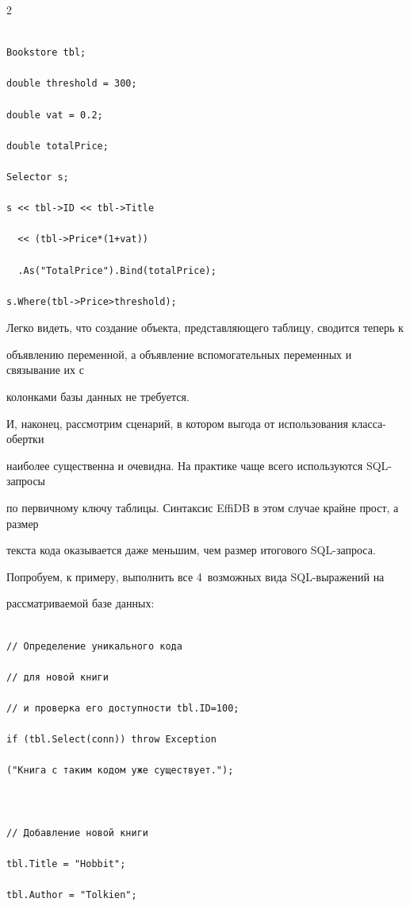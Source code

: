 \begin{multicols}{2}
\begin{verbatim}

Bookstore tbl;

double threshold = 300;

double vat = 0.2;

double totalPrice;

Selector s;

s << tbl->ID << tbl->Title

  << (tbl->Price*(1+vat))

  .As("TotalPrice").Bind(totalPrice);

s.Where(tbl->Price>threshold);

\end{verbatim}



Легко видеть, что создание объекта, пред\-став\-ля\-юще\-го таблицу, сводится теперь к 

объявлению переменной, а объявление вспомогательных переменных и связывание их с 

колонками базы данных не требуется.



И, наконец, рассмотрим сценарий, в котором выгода от использования клас\-са-оберт\-ки 

наиболее существенна и очевидна. На практике чаще всего используются SQL-за\-про\-сы 

по первичному ключу таблицы. Синтаксис EffiDB в этом случае крайне прост, а размер 

текста кода оказывается даже меньшим, чем размер итогового SQL-за\-проса.



Попробуем, к примеру, выполнить все 4~возможных вида SQL-выражений на 

рассматриваемой базе данных: 

\begin{verbatim}

// Определение уникального кода

// для новой книги

// и проверка его доступности tbl.ID=100;

if (tbl.Select(conn)) throw Exception 

("Книга с таким кодом уже существует.");



// Добавление новой книги

tbl.Title = "Hobbit";

tbl.Author = "Tolkien";


\end{verbatim}
\end{multicols}
